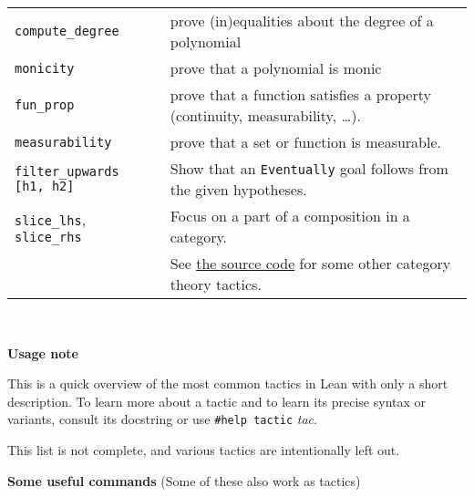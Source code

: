 \documentclass[a4paper]{article}
\newcommand{\lean}[1]{{\tt #1}}
\newcommand{\tactic}[1][]{\textit{tac#1}\xspace} %
\begin{document}
\begin{center}
\begin{longtable}{@{}lp{113mm}@{}}
  \lean{compute\_degree} & prove (in)equalities about the degree of a polynomial \\
  \lean{monicity} & prove that a polynomial is monic \\
  \lean{fun\_prop} & prove that a function satisfies a property (continuity, measurability, \ldots). \\
  \lean{measurability} & prove that a set or function is measurable. \\
  \lean{filter\_upwards [h1, h2]} & Show that an \lean{Eventually} goal follows from the given hypotheses. \\
  \lean{slice\_lhs}, \lean{slice\_rhs} & Focus on a part of a composition in a category.\\
    & See \href{https://github.com/leanprover-community/mathlib4/tree/master/Mathlib/Tactic/CategoryTheory}{the source code} for some other category theory tactics. \\
  \bottomrule
\end{longtable}
\mbox{}\\
\end{center}

\textbf{Usage note}

This is a quick overview of the most common tactics in Lean with only a short description. To learn more about a tactic and to learn its precise syntax or variants, consult its docstring or use \lean{\#help tactic} \tactic.

This list is not complete, and various tactics are intentionally left out.
\bigskip

\textbf{Some useful commands} (Some of these also work as tactics)
\end{document}
